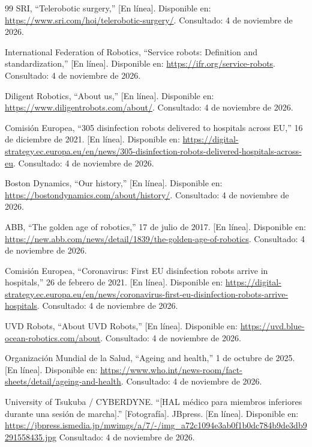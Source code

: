 \documentclass[11pt,a4paper]{article}
\begin{document}
\begin{thebibliography}{99}
SRI, ``Telerobotic surgery,'' [En línea]. Disponible en: \url{https://www.sri.com/hoi/telerobotic-surgery/}. Consultado: 4 de noviembre de 2026.

International Federation of Robotics, ``Service robots: Definition and standardization,''
[En línea]. Disponible en: \url{https://ifr.org/service-robots}. Consultado: 4 de noviembre de 2026.

Diligent Robotics, ``About us,'' [En línea]. Disponible en: \url{https://www.diligentrobots.com/about/}. Consultado: 4 de noviembre de 2026.

Comisión Europea, ``305 disinfection robots delivered to hospitals across EU,'' 16 de diciembre de 2021.
[En línea]. Disponible en: \url{https://digital-strategy.ec.europa.eu/en/news/305-disinfection-robots-delivered-hospitals-across-eu}. Consultado: 4 de noviembre de 2026.

Boston Dynamics, ``Our history,'' [En línea]. Disponible en: \url{https://bostondynamics.com/about/history/}. Consultado: 4 de noviembre de 2026.

ABB, ``The golden age of robotics,'' 17 de julio de 2017. [En línea]. Disponible en: \url{https://new.abb.com/news/detail/1839/the-golden-age-of-robotics}. Consultado: 4 de noviembre de 2026.

Comisión Europea, ``Coronavirus: First EU disinfection robots arrive in hospitals,'' 26 de febrero de 2021.
[En línea]. Disponible en: \url{https://digital-strategy.ec.europa.eu/en/news/coronavirus-first-eu-disinfection-robots-arrive-hospitals}. Consultado: 4 de noviembre de 2026.

UVD Robots, ``About UVD Robots,'' [En línea]. Disponible en: \url{https://uvd.blue-ocean-robotics.com/about}. Consultado: 4 de noviembre de 2026.

Organización Mundial de la Salud, ``Ageing and health,'' 1 de octubre de 2025.
[En línea]. Disponible en: \url{https://www.who.int/news-room/fact-sheets/detail/ageing-and-health}. Consultado: 4 de noviembre de 2026.

University of Tsukuba / CYBERDYNE. ``[HAL médico para miembros inferiores durante una sesión de marcha].'' [Fotografía]. JBpress. [En línea]. Disponible en: \url{https://jbpress.ismedia.jp/mwimgs/a/7/-/img_a72c1094e3ab0f1b0dc784b9de3db9291558435.jpg} Consultado: 4 de noviembre de 2026.


\end{thebibliography}
\end{document}
